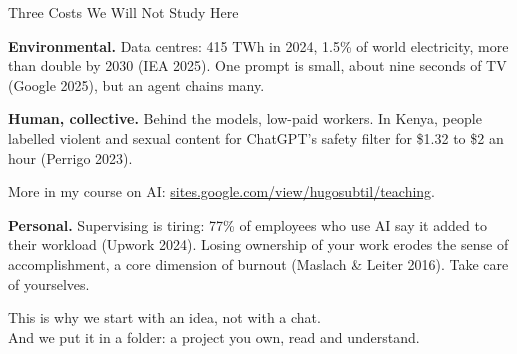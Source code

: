 \documentclass[svgnames,x11names,dvipsnames]{beamer}
\begin{document}
\begin{frame}{Three Costs We Will Not Study Here}

\small
\textbf{Environmental.} Data centres: 415 TWh in 2024, 1.5\% of world electricity, more than double by 2030 (IEA 2025). One prompt is small, about nine seconds of TV (Google 2025), but an agent chains many.

\vspace{0.25cm}

\textbf{Human, collective.} Behind the models, low-paid workers. In Kenya, people labelled violent and sexual content for ChatGPT's safety filter for \$1.32 to \$2 an hour (Perrigo 2023).

\vspace{0.1cm}
{\footnotesize More in my course on AI: \href{https://sites.google.com/view/hugosubtil/teaching}{\textcolor{titleblue}{sites.google.com/view/hugosubtil/teaching}}.}

\vspace{0.25cm}

\textbf{Personal.} Supervising is tiring: 77\% of employees who use AI say it added to their workload (Upwork 2024). Losing ownership of your work erodes the sense of accomplishment, a core dimension of burnout (Maslach \& Leiter 2016). \alert{Take care of yourselves.}

\vspace{0.35cm}

\pause

\centering
This is why we start with an \alert{idea}, not with a chat.\\
And we put it in a folder: a project you own, read and understand.

\end{frame}

\end{document}
